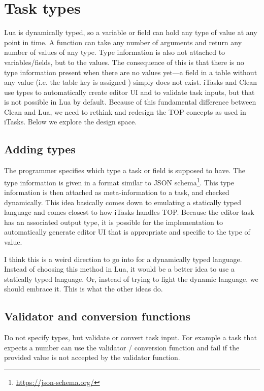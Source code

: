 \section{Task types}\label{section-types}

Lua is dynamically typed, so a variable or field can hold any type of value at any point in time. A function can take any number of arguments and return any number of values of any type. Type information is also not attached to variables/fields, but to the values. The consequence of this is that there is no type information present when there are no values yet---a field in a table without any value (i.e. the table key is assigned ) simply does not exist.
iTasks and Clean use types to automatically create editor UI and to validate task inputs, but that is not possible in Lua by default. Because of this fundamental difference between Clean and Lua, we need to rethink and redesign the TOP concepts as used in iTasks. Below we explore the design space.

\subsection{Adding types}\label{section-types-adding}
The programmer specifies which type a task or field is supposed to have. The type information is given in a format similar to JSON schema\footnote{\label{footnote-json-schema}\url{https://json-schema.org/}}. This type information is then attached as meta-information to a task, and checked dynamically. This idea basically comes down to emulating a statically typed language and comes closest to how iTasks handles TOP. Because the editor task has an associated output type, it is possible for the implementation to automatically generate editor UI that is appropriate and specific to the type of value.

I think this is a weird direction to go into for a dynamically typed language. Instead of choosing this method in Lua, it would be a better idea to use a statically typed language. Or, instead of trying to fight the dynamic language, we should embrace it. This is what the other ideas do.

\subsection{Validator and conversion functions}\label{section-types-validator-conversion}
Do not specify types, but validate or convert task input. For example a task that expects a number can use the  validator / conversion function and fail if the provided value is not accepted by the validator function.

